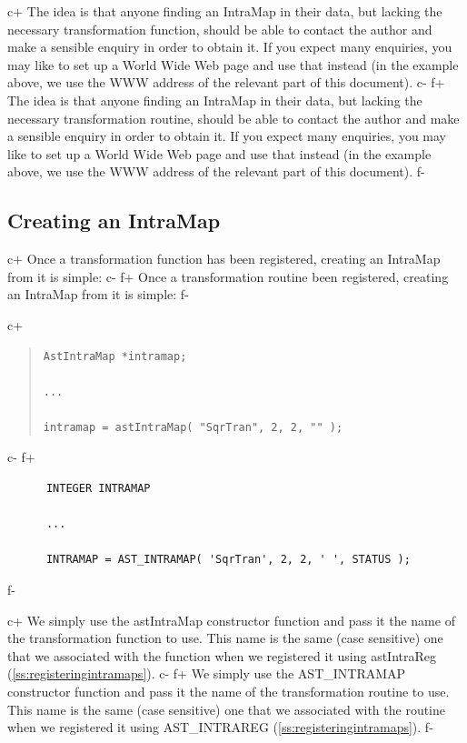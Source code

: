 \documentclass[twoside,11pt]{article}
\newcommand{\secref}[1]{\S\ref{#1}}
\renewcommand{\secref}[1]{\ref{#1}}
\begin{document}
c+
The idea is that anyone finding an IntraMap in their data, but lacking
the necessary transformation function, should be able to contact the
author and make a sensible enquiry in order to obtain it. If you
expect many enquiries, you may like to set up a World Wide Web page
and use that instead (in the example above, we use the WWW address of
the relevant part of this document).
c-
f+
The idea is that anyone finding an IntraMap in their data, but lacking
the necessary transformation routine, should be able to contact the
author and make a sensible enquiry in order to obtain it. If you
expect many enquiries, you may like to set up a World Wide Web page
and use that instead (in the example above, we use the WWW address of
the relevant part of this document).
f-

\subsection{Creating an IntraMap}

c+
Once a transformation function has been registered, creating an
IntraMap from it is simple:
c-
f+
Once a transformation routine been registered, creating an IntraMap
from it is simple:
f-

c+
\begin{quote}
\small
\begin{verbatim}
AstIntraMap *intramap;

...

intramap = astIntraMap( "SqrTran", 2, 2, "" );
\end{verbatim}
\normalsize
\end{quote}
c-
f+
\small
\begin{verbatim}
      INTEGER INTRAMAP

      ...

      INTRAMAP = AST_INTRAMAP( 'SqrTran', 2, 2, ' ', STATUS );
\end{verbatim}
\normalsize
f-

c+
We simply use the astIntraMap constructor function and pass it the
name of the transformation function to use. This name is the same
(case sensitive) one that we associated with the function when we
registered it using astIntraReg (\secref{ss:registeringintramaps}).
c-
f+
We simply use the AST\_INTRAMAP constructor function and pass it the
name of the transformation routine to use. This name is the same (case
sensitive) one that we associated with the routine when we registered
it using AST\_INTRAREG (\secref{ss:registeringintramaps}).
f-
\end{document}
